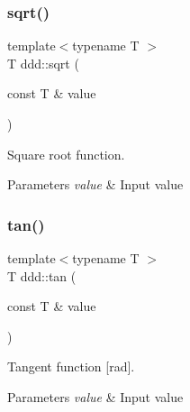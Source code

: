 \subsubsection{\texorpdfstring{sqrt()}{sqrt()}}
{\footnotesize\ttfamily template$<$typename T $>$ \\
T ddd\+::sqrt (\begin{DoxyParamCaption}\item[{const T \&}]{value }\end{DoxyParamCaption})\hspace{0.3cm}{\ttfamily [inline]}}



Square root function. 


\begin{DoxyParams}{Parameters}
{\em value} & Input value \\
\hline
\end{DoxyParams}
\mbox{\label{namespaceddd_aeb0ca0d620545cbb5ef955eed88d1c0d}} 
\subsubsection{\texorpdfstring{tan()}{tan()}}
{\footnotesize\ttfamily template$<$typename T $>$ \\
T ddd\+::tan (\begin{DoxyParamCaption}\item[{const T \&}]{value }\end{DoxyParamCaption})\hspace{0.3cm}{\ttfamily [inline]}}



Tangent function \mbox{[}rad\mbox{]}. 


\begin{DoxyParams}{Parameters}
{\em value} & Input value \\
\hline
\end{DoxyParams}
